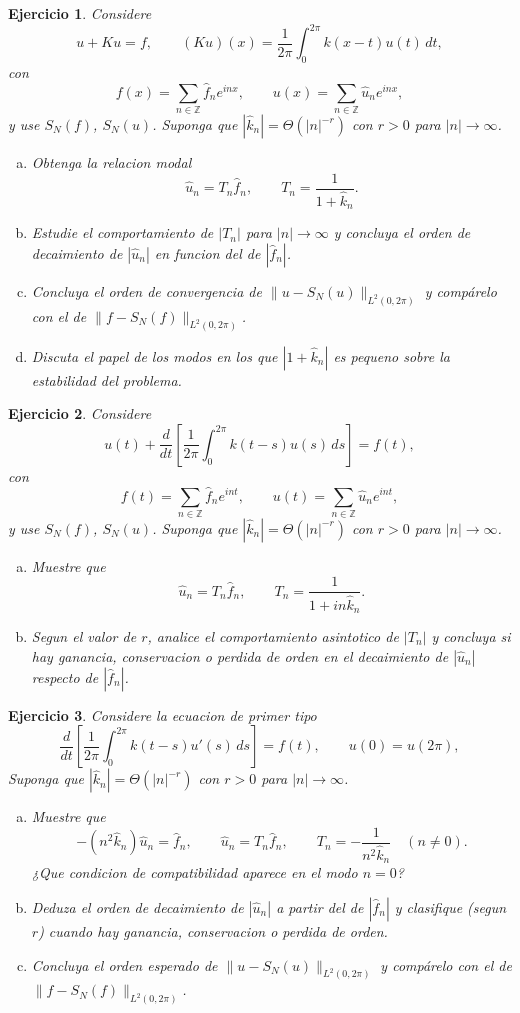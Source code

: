 \documentclass[12pt]{article}
\newtheorem{exercise}{Ejercicio}
\newcommand{\bej}{\begin{exercise}\rm}
\newcommand{\fej}{\end{exercise}}
\begin{document}
\bej
Considere
\[
u+Ku=f,
\qquad
(Ku)(x)=\frac{1}{2\pi}\int_0^{2\pi}k(x-t)u(t)\,dt,
\]
con
\[
f(x)=\sum_{n\in\mathbb Z}\hat f_n e^{inx},
\qquad
u(x)=\sum_{n\in\mathbb Z}\hat u_n e^{inx},
\]
y use $S_N(f)$, $S_N(u)$.
Suponga que $|\hat k_n|=\Theta(|n|^{-r})$ con $r>0$ para $|n|\to\infty$.
\begin{enumerate}[(a)]
    \item Obtenga la relacion modal
    \[
    \hat u_n=T_n\hat f_n,
    \qquad
    T_n=\frac{1}{1+\hat k_n}.
    \]
    \item Estudie el comportamiento de $|T_n|$ para $|n|\to\infty$ y concluya el orden de decaimiento de $|\hat u_n|$ en funcion del de $|\hat f_n|$.
    \item Concluya el orden de convergencia de $\|u-S_N(u)\|_{L^2(0,2\pi)}$ y compárelo con el de $\|f-S_N(f)\|_{L^2(0,2\pi)}$.
    \item Discuta el papel de los modos en los que $|1+\hat k_n|$ es pequeno sobre la estabilidad del problema.
\end{enumerate}
\fej

\bej
Considere
\[
u(t)+\frac{d}{dt}\left[\frac{1}{2\pi}\int_0^{2\pi}k(t-s)u(s)\,ds\right]=f(t),
\]
con
\[
f(t)=\sum_{n\in\mathbb Z}\hat f_n e^{int},
\qquad
u(t)=\sum_{n\in\mathbb Z}\hat u_n e^{int},
\]
y use $S_N(f)$, $S_N(u)$.
Suponga que $|\hat k_n|=\Theta(|n|^{-r})$ con $r>0$ para $|n|\to\infty$.
\begin{enumerate}[(a)]
    \item Muestre que
    \[
    \hat u_n=T_n\hat f_n,
    \qquad
    T_n=\frac{1}{1+in\hat k_n}.
    \]
    \item Segun el valor de $r$, analice el comportamiento asintotico de $|T_n|$ y concluya si hay ganancia, conservacion o perdida de orden en el decaimiento de $|\hat u_n|$ respecto de $|\hat f_n|$.
\end{enumerate}
\fej

\bej
Considere la ecuacion de primer tipo
\[
\frac{d}{dt}\left[\frac{1}{2\pi}\int_0^{2\pi}k(t-s)u'(s)\,ds\right]=f(t), \qquad u(0)=u(2\pi),
\]
Suponga que $|\hat k_n|=\Theta(|n|^{-r})$ con $r>0$ para $|n|\to\infty$.
\begin{enumerate}[(a)]
    \item Muestre que
    \[
    -(n^2\hat k_n)\hat u_n=\hat f_n,
    \qquad
    \hat u_n=T_n\hat f_n,
    \qquad
    T_n=-\frac{1}{n^2\hat k_n}\quad (n\neq 0).
    \]
    ¿Que condicion de compatibilidad aparece en el modo $n=0$?
    \item Deduza el orden de decaimiento de $|\hat u_n|$ a partir del de $|\hat f_n|$ y clasifique (segun $r$) cuando hay ganancia, conservacion o perdida de orden.
    \item Concluya el orden esperado de $\|u-S_N(u)\|_{L^2(0,2\pi)}$ y compárelo con el de $\|f-S_N(f)\|_{L^2(0,2\pi)}$.
\end{enumerate}
\fej
\end{document}

